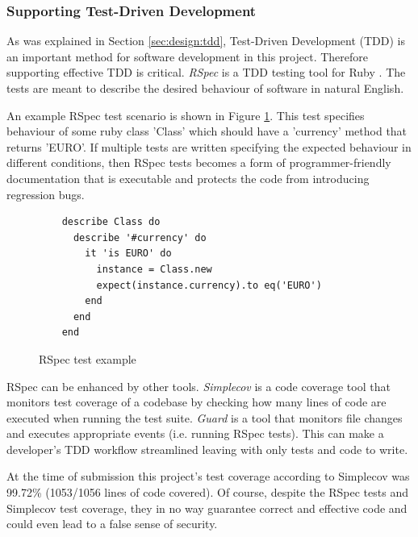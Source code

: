 \subsubsection{Supporting Test-Driven Development}
\label{sec:design:software:tdd}

As was explained in Section \ref{sec:design:tdd}, Test-Driven Development (TDD)
is an important method for software development in this project. Therefore
supporting effective TDD is critical. \textit{RSpec} is a TDD testing tool for
Ruby \parencite{Rspec}. The tests are meant to describe the desired behaviour of
software in natural English.

An example RSpec test scenario is shown in Figure \ref{figure:RSpec}. This test
specifies behaviour of some ruby class 'Class' which should have a 'currency'
method that returns 'EURO'. If multiple tests are written specifying the
expected behaviour in different conditions, then RSpec tests becomes a form of
programmer-friendly documentation that is executable and protects the code from
introducing regression bugs.

\begin{figure}
  \begin{verbatim}
    describe Class do
      describe '#currency' do
        it 'is EURO' do
          instance = Class.new
          expect(instance.currency).to eq('EURO')
        end
      end
    end
  \end{verbatim}
  \caption{
    RSpec test example
    \label{figure:RSpec}
  }
\end{figure}

RSpec can be enhanced by other tools. \textit{Simplecov} \parencite{Simplecov}
is a code coverage tool that monitors test coverage of a codebase by checking
how many lines of code are executed when running the test suite. \textit{Guard}
\parencite{Guard} is a tool that monitors file changes and executes appropriate
events (i.e. running RSpec tests). This can make a developer's TDD workflow
streamlined leaving with only tests and code to write.

At the time of submission this project's test coverage according to Simplecov
was 99.72\% (1053/1056 lines of code covered). Of course, despite the RSpec
tests and Simplecov test coverage, they in no way guarantee correct and
effective code and could even lead to a false sense of security.
